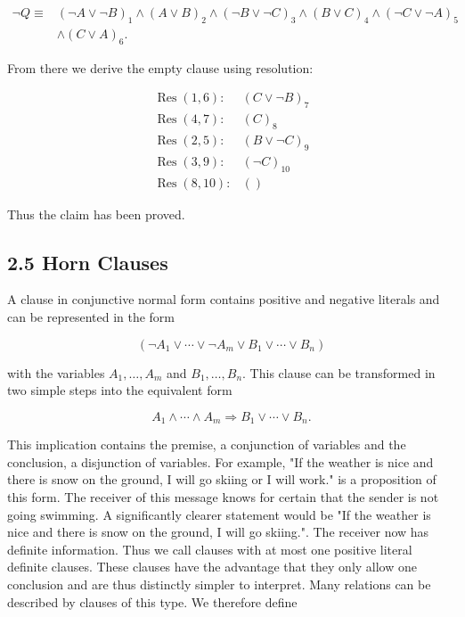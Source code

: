 \documentclass[10pt]{article}
\begin{document}
$$
\begin{aligned}
\neg Q \equiv & (\neg A \vee \neg B)_{1} \wedge(A \vee B)_{2} \wedge(\neg B \vee \neg C)_{3} \wedge(B \vee C)_{4} \wedge(\neg C \vee \neg A)_{5} \\
& \wedge(C \vee A)_{6} .
\end{aligned}
$$

From there we derive the empty clause using resolution:

$$
\begin{array}{ll}
\operatorname{Res}(1,6): & (C \vee \neg B)_{7} \\
\operatorname{Res}(4,7): & (C)_{8} \\
\operatorname{Res}(2,5): & (B \vee \neg C)_{9} \\
\operatorname{Res}(3,9): & (\neg C)_{10} \\
\operatorname{Res}(8,10): & ()
\end{array}
$$

Thus the claim has been proved.

\subsection*{2.5 Horn Clauses}
A clause in conjunctive normal form contains positive and negative literals and can be represented in the form

$$
\left(\neg A_{1} \vee \cdots \vee \neg A_{m} \vee B_{1} \vee \cdots \vee B_{n}\right)
$$

with the variables $A_{1}, \ldots, A_{m}$ and $B_{1}, \ldots, B_{n}$. This clause can be transformed in two simple steps into the equivalent form

$$
A_{1} \wedge \cdots \wedge A_{m} \Rightarrow B_{1} \vee \cdots \vee B_{n} .
$$

This implication contains the premise, a conjunction of variables and the conclusion, a disjunction of variables. For example, "If the weather is nice and there is snow on the ground, I will go skiing or I will work." is a proposition of this form. The receiver of this message knows for certain that the sender is not going swimming. A significantly clearer statement would be "If the weather is nice and there is snow on the ground, I will go skiing.". The receiver now has definite information. Thus we call clauses with at most one positive literal definite clauses. These clauses have the advantage that they only allow one conclusion and are thus distinctly simpler to interpret. Many relations can be described by clauses of this type. We therefore define
\end{document}
